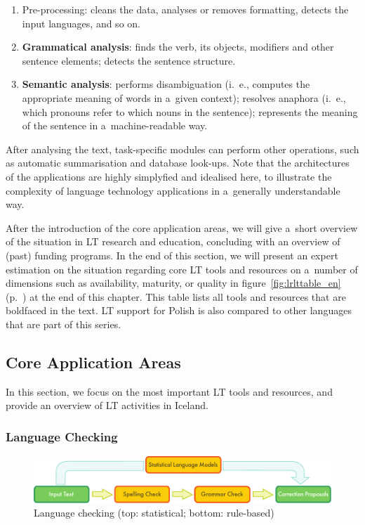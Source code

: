 \begin{multicols}{2}
\begin{enumerate} \item Pre-processing: cleans the data, analyses or
removes formatting, detects the input languages, and so on. \item
\textbf{Grammatical analysis}: finds the verb, its objects, modifiers and other sentence elements; detects the sentence structure. \item
\textbf{Semantic analysis}: performs disambiguation (i.\, e., computes
the appropriate meaning of words in a~given context); resolves
anaphora (i.\, e., which pronouns refer to which nouns in the
sentence); represents the meaning of the sentence in
a~machine-readable way. \end{enumerate} 

After analysing the text, task-specific modules can perform other
operations, such as automatic summarisation and database look-ups.
Note that the architectures of the applications are highly simplyfied
and idealised here, to illustrate the complexity of language
technology applications in a~generally understandable way. 

After the introduction of the core application areas, we will give
a~short overview of the situation in LT research and education,
concluding with an overview of (past) funding programs. In the end of
this section, we will present an expert estimation on the situation
regarding core LT tools and resources on a~number of dimensions such
as availability, maturity, or quality in figure~\ref{fig:lrlttable_en} (p.~\pageref{fig:lrlttable_en}) at the end of this
chapter. This table lists all tools and resources that are boldfaced
in the text. LT support for Polish is also compared to other languages
that are part of this series. 

\subsection{Core Application Areas} 

In this section, we focus on the most important LT tools and
resources, and provide an overview of LT activities in Iceland. 

\subsubsection{Language Checking} 

\begin{figure}[t]  \center
\includegraphics[width=\textwidth]{../_media/english/language_checking}
\caption{Language checking (top: statistical; bottom: rule-based)}
\label{fig:langcheckingaarch_en} 
\end{figure} 


\end{multicols}
